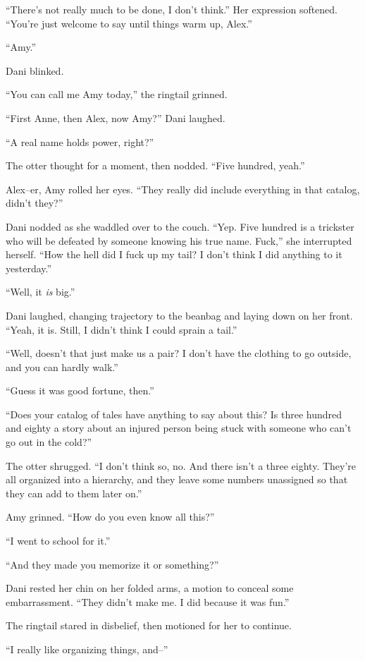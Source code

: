 ``There's not really much to be done, I don't think.'' Her expression softened. ``You're just welcome to say until things warm up, Alex.''

``Amy.''

Dani blinked.

``You can call me Amy today,'' the ringtail grinned.

``First Anne, then Alex, now Amy?'' Dani laughed.

``A real name holds power, right?''

The otter thought for a moment, then nodded. ``Five hundred, yeah.''

Alex--er, Amy rolled her eyes. ``They really did include everything in that catalog, didn't they?''

Dani nodded as she waddled over to the couch. ``Yep. Five hundred is a trickster who will be defeated by someone knowing his true name. Fuck,'' she interrupted herself. ``How the hell did I fuck up my tail? I don't think I did anything to it yesterday.''

``Well, it \emph{is} big.''

Dani laughed, changing trajectory to the beanbag and laying down on her front. ``Yeah, it is. Still, I didn't think I could sprain a tail.''

``Well, doesn't that just make us a pair? I don't have the clothing to go outside, and you can hardly walk.''

``Guess it was good fortune, then.''

``Does your catalog of tales have anything to say about this? Is three hundred and eighty a story about an injured person being stuck with someone who can't go out in the cold?''

The otter shrugged. ``I don't think so, no. And there isn't a three eighty. They're all organized into a hierarchy, and they leave some numbers unassigned so that they can add to them later on.''

Amy grinned. ``How do you even know all this?''

``I went to school for it.''

``And they made you memorize it or something?''

Dani rested her chin on her folded arms, a motion to conceal some embarrassment. ``They didn't make me. I did because it was fun.''

The ringtail stared in disbelief, then motioned for her to continue.

``I really like organizing things, and--''

